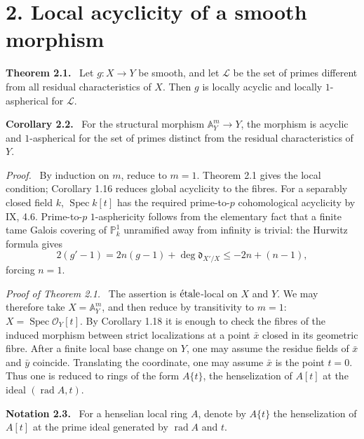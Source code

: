 \documentclass[12pt]{article}
\newcommand{\Oo}{\mathcal{O}}
\newcommand{\LL}{\mathcal L}
\newcommand{\Spec}{\operatorname{Spec}}
\newcommand{\etale}{\ifmmode\textnormal{\'etale}\else\'etale\fi}
\newenvironment{statement}[1]{\par\medskip\noindent\textbf{#1.}\ }{\par\medskip}
\newenvironment{prooftext}[1][Proof]{\par\noindent\emph{#1.}\ }{\par\medskip}
\begin{document}
\section*{2. Local acyclicity of a smooth morphism}

\begin{statement}{Theorem 2.1}
Let \(g:X\to Y\) be smooth, and let \(\LL\) be the set of primes different from all residual characteristics of \(X\). Then \(g\) is locally acyclic and locally \(1\)-aspherical for \(\LL\).
\end{statement}

\begin{statement}{Corollary 2.2}
For the structural morphism \(\mathbb A^m_Y\to Y\), the morphism is acyclic and \(1\)-aspherical for the set of primes distinct from the residual characteristics of \(Y\).
\end{statement}

\begin{prooftext}
By induction on \(m\), reduce to \(m=1\). Theorem 2.1 gives the local condition; Corollary 1.16 reduces global acyclicity to the fibres. For a separably closed field \(k\), \(\Spec k[t]\) has the required prime-to-\(p\) cohomological acyclicity by IX, 4.6. Prime-to-\(p\) \(1\)-asphericity follows from the elementary fact that a finite tame Galois covering of \(\mathbb P^1_k\) unramified away from infinity is trivial: the Hurwitz formula gives
\[
2(g'-1)=2n(g-1)+\deg\mathfrak d_{X'/X}\le -2n+(n-1),
\]
forcing \(n=1\).
\end{prooftext}

\begin{prooftext}[Proof of Theorem 2.1]
The assertion is \(\etale\)-local on \(X\) and \(Y\). We may therefore take \(X=\mathbb A^m_Y\), and then reduce by transitivity to \(m=1\): \(X=\Spec\Oo_Y[t]\). By Corollary 1.18 it is enough to check the fibres of the induced morphism between strict localizations at a point \(\bar x\) closed in its geometric fibre. After a finite local base change on \(Y\), one may assume the residue fields of \(\bar x\) and \(\bar y\) coincide. Translating the coordinate, one may assume \(\bar x\) is the point \(t=0\). Thus one is reduced to rings of the form \(A\{t\}\), the henselization of \(A[t]\) at the ideal \((\operatorname{rad}A,t)\).
\end{prooftext}

\begin{statement}{Notation 2.3}
For a henselian local ring \(A\), denote by \(A\{t\}\) the henselization of \(A[t]\) at the prime ideal generated by \(\operatorname{rad}A\) and \(t\).
\end{statement}
\end{document}
